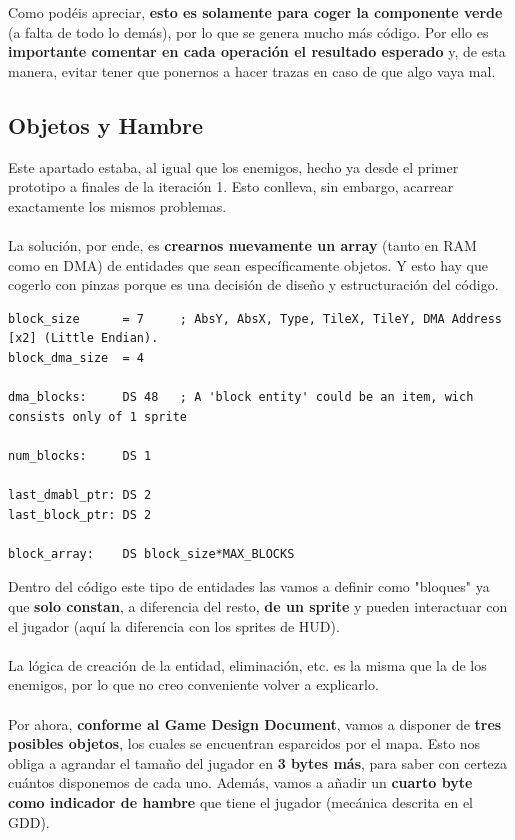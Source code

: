 Como podéis apreciar, \textbf{esto es solamente para coger la componente verde} (a falta de todo lo demás), por lo que se genera mucho más código. Por ello es \textbf{importante comentar en cada operación el resultado esperado} y, de esta manera, evitar tener que ponernos a hacer trazas en caso de que algo vaya mal.

\subsection{Objetos y Hambre}

Este apartado estaba, al igual que los enemigos, hecho ya desde el primer prototipo a finales de la iteración 1. Esto conlleva, sin embargo, acarrear exactamente los mismos problemas.
\\ \\
La solución, por ende, es \textbf{crearnos nuevamente un array} (tanto en RAM como en DMA) de entidades que sean específicamente objetos. Y esto hay que cogerlo con pinzas porque es una decisión de diseño y estructuración del código.

\begin{lstlisting}[caption={Vector de Objetos}, label={code:itemarray}]
block_size  	= 7 	; AbsY, AbsX, Type, TileX, TileY, DMA Address [x2] (Little Endian).
block_dma_size 	= 4

dma_blocks:     DS 48   ; A 'block entity' could be an item, wich consists only of 1 sprite

num_blocks:     DS 1

last_dmabl_ptr: DS 2
last_block_ptr: DS 2

block_array: 	DS block_size*MAX_BLOCKS
\end{lstlisting}

Dentro del código este tipo de entidades las vamos a definir como "bloques" ya que \textbf{solo constan}, a diferencia del resto, \textbf{de un sprite} y pueden interactuar con el jugador (aquí la diferencia con los sprites de HUD).
\\ \\
La lógica de creación de la entidad, eliminación, etc. es la misma que la de los enemigos, por lo que no creo conveniente volver a explicarlo.
\\ \\
Por ahora, \textbf{conforme al Game Design Document}, vamos a disponer de \textbf{tres posibles objetos}, los cuales se encuentran esparcidos por el mapa. Esto nos obliga a agrandar el tamaño del jugador en \textbf{3 bytes más}, para saber con certeza cuántos disponemos de cada uno. Además, vamos a añadir un \textbf{cuarto byte como indicador de hambre} que tiene el jugador (mecánica descrita en el GDD).

